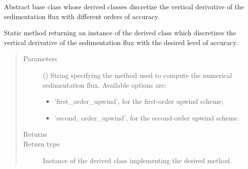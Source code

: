 \documentclass[letterpaper,10pt,english]{sphinxmanual}
\begin{document}
\begin{fulllineitems}
\label{\detokenize{api:tasmania.dycore.flux_sedimentation.FluxSedimentation}}
Abstract base class whose derived classes discretize the vertical derivative of the sedimentation flux
with different orders of accuracy.

\begin{fulllineitems}
\label{\detokenize{api:tasmania.dycore.flux_sedimentation.FluxSedimentation.factory}}
Static method returning an instance of the derived class which discretizes the vertical derivative of
the sedimentation flux with the desired level of accuracy.
\begin{quote}\begin{description}
\item[{Parameters}] \leavevmode
{} () \textendash{} 
String specifying the method used to compute the numerical sedimentation flux. Available options are:
\begin{itemize}
\item {} 
’first\_order\_upwind’, for the first-order upwind scheme;

\item {} 
’second\_order\_upwind’, for the second-order upwind scheme.

\end{itemize}


\item[{Returns}] \leavevmode


\item[{Return type}] \leavevmode
Instance of the derived class implementing the desired method.

\end{description}\end{quote}

\end{fulllineitems}



\end{fulllineitems}
\end{document}
